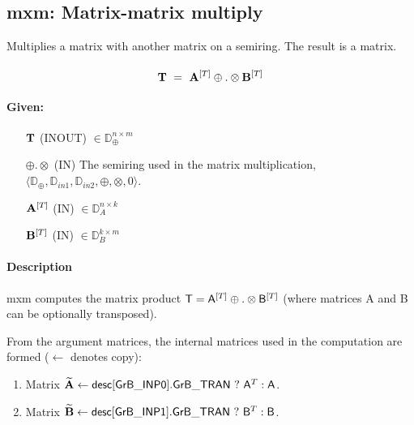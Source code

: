 \subsection{{\sf mxm}: Matrix-matrix multiply}

Multiplies a matrix with another matrix on a semiring. The result is a matrix.

\paragraph{\syntax}

$$
{\bf T} ~ = ~ {\bf A}^{[T]} \oplus.\otimes {\bf B}^{[T]}
$$

\paragraph{Given:}

\begin{itemize}[leftmargin=0.7in]
    \item[${\bf T}$]    ({\sf INOUT}) $\in \mathbb{D}_\oplus^{n\times m}$
    
    \item[$\oplus.\otimes$]   ({\sf IN}) The semiring used in the matrix
    multiplication, $\langle \mathbb{D}_\oplus, \mathbb{D}_{in1},\mathbb{D}_{in2},\oplus,\otimes,0 \rangle$.

    \item[${\bf A}^{[T]}$]    ({\sf IN}) $\in \mathbb{D}_A^{n\times k}$

    \item[${\bf B}^{[T]}$]    ({\sf IN}) $\in \mathbb{D}_B^{k\times m}$

\end{itemize}


\paragraph{Description}

{\sf mxm} computes the matrix product ${\sf T} = {\sf
A}^{[T]} \oplus . \otimes {\sf B}^{[T]}$ (where matrices {\sf A}
and {\sf B} can be optionally transposed).  




From the argument matrices, the internal matrices used in 
the computation are formed ($\leftarrow$ denotes copy): 
\begin{enumerate}

	\item Matrix ${\bf \widetilde{A}} \leftarrow
    {\sf desc[GrB\_INP0].GrB\_TRAN} \ ? \ {\sf A}^T : {\sf A}$.

	\item Matrix ${\bf \widetilde{B}} \leftarrow
    {\sf desc[GrB\_INP1].GrB\_TRAN} \ ? \ {\sf B}^T : {\sf B}$.
\end{enumerate}

